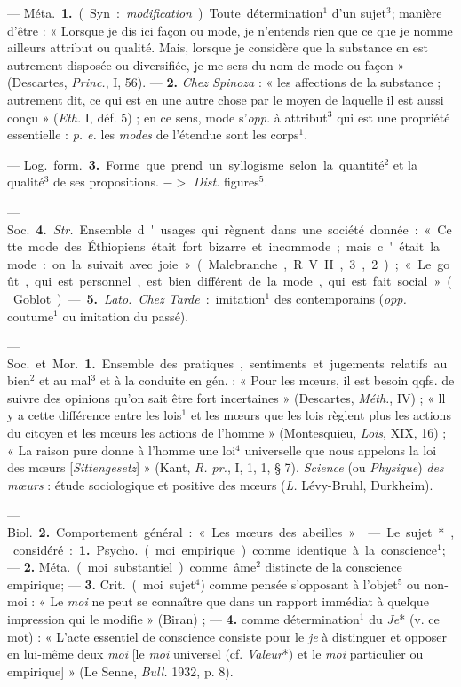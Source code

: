 \begin{itemize}[leftmargin=1cm, label=, itemsep=1pt]
 — \si{Méta.} {\bf 1.} (Syn. : {\it modification}). Toute
détermination$^1$ d’un sujet$^3$; manière d’être : « Lorsque je dis ici façon
ou mode, je n’entends rien que ce que je nomme ailleurs attribut ou qualité.
Mais, lorsque je considère que la substance en est autrement disposée ou
diversifiée, je me sers du nom de mode ou façon » (Descartes, {\it Princ.},
I, 56). — {\bf 2.} {\it Chez Spinoza} : « les affections de la substance ;
autrement dit, ce qui est en une autre chose par le moyen de laquelle il est
aussi conçu » ({\it Eth.} I, déf. 5) ; en ce sens, mode s’{\it opp.} à
attribut$^3$ qui est une propriété essentielle : {\it p. e.} les {\it modes}
de l'étendue sont les corps$^1$.

— \si{Log.} \si{form.} {\bf 3.} Forme que prend un syllogisme selon la
quantité$^2$ et la qualité$^3$ de ses propositions. $->$ {\it Dist.}
figures$^5$.

 — \si{Soc.} {\bf 4.} {\it Str.} Ensemble d'usages qui
règnent dans une société
donnée : « Cette mode des Éthiopiens était fort bizarre et incommode; mais
c'était la mode : on la suivait avec joie » (Malebranche, R. V. II, 3, 2) ;
« Le goût, qui est personnel, est bien différent de la mode, qui est fait
social » (Goblot). — {\bf 5.} {\it Lato.} {\it Chez Tarde} : imitation$^1$
des contemporains ({\it opp.} coutume$^1$ ou imitation du passé).

 — \si{Soc.} et \si{Mor.} {\bf 1.} Ensemble des pratiques,
sentiments et jugements relatifs au bien$^2$ et au mal$^3$ et à la conduite
en gén. : « Pour les mœurs, il est besoin qqfs. de suivre des opinions qu'on
sait être fort incertaines » (Descartes, {\it Méth.}, IV) ; « ll y a cette
différence entre les lois$^1$ et les mœurs que les lois règlent plus les
actions du citoyen et les mœurs les actions de l’homme » (Montesquieu,
{\it Lois}, XIX, 16) ; « La raison pure donne à l’homme une loi$^4$ universelle
que nous appelons la loi des mœurs [{\it Sittengesetz}] » (Kant, {\it R.
pr.}, I, 1, 1, § 7). {\it Science} (ou {\it Physique}) {\it des mœurs} :
étude sociologique et positive des mœurs ({\it L.} Lévy-Bruhl, Durkheim).

— \si{Biol.} {\bf 2.} Comportement général : « Les mœurs des abeilles ».

 — Le sujet*, considéré : {\bf 1.} \si{Psycho.} (moi empirique) comme
identique à la conscience$^1$; — {\bf 2.} \si{Méta.} (moi substantiel) comme
âme$^2$ distincte de la conscience empirique; — {\bf 3.} \si{Crit.} (moi
sujet$^4$) comme pensée s'opposant à l'objet$^5$ ou non-moi : « Le {\it moi}
ne peut se connaître que dans un rapport immédiat à quelque impression qui le
modifie » (Biran) ; — {\bf 4.} comme détermination$^1$ du {\it Je}* (v. ce mot) :
« L’acte essentiel de conscience consiste pour le {\it je} à distinguer et
opposer en lui-même deux {\it moi} [le {\it moi} universel (cf.
{\it Valeur}*)
et le {\it moi} particulier ou empirique] » (Le Senne, {\it Bull.} 1932, p. 8).


\end{itemize}
